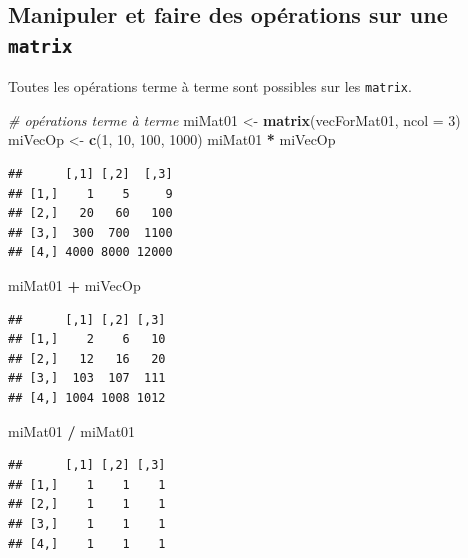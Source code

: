 \documentclass[]{book}
\newenvironment{Shaded}{\begin{snugshade}}{\end{snugshade}}
\newcommand{\CommentTok}[1]{\textcolor[rgb]{0.56,0.35,0.01}{\textit{#1}}}
\newcommand{\DataTypeTok}[1]{\textcolor[rgb]{0.13,0.29,0.53}{#1}}
\newcommand{\DecValTok}[1]{\textcolor[rgb]{0.00,0.00,0.81}{#1}}
\newcommand{\KeywordTok}[1]{\textcolor[rgb]{0.13,0.29,0.53}{\textbf{#1}}}
\newcommand{\NormalTok}[1]{#1}
\newcommand{\OperatorTok}[1]{\textcolor[rgb]{0.81,0.36,0.00}{\textbf{#1}}}
\newcommand{\StringTok}[1]{\textcolor[rgb]{0.31,0.60,0.02}{#1}}
\begin{document}
\hypertarget{manipuler-et-faire-des-operations-sur-une-matrix}{%
\subsection{\texorpdfstring{Manipuler et faire des opérations sur une \texttt{matrix}}{Manipuler et faire des opérations sur une matrix}}\label{manipuler-et-faire-des-operations-sur-une-matrix}}

Toutes les opérations terme à terme sont possibles sur les \texttt{matrix}.

\begin{Shaded}
\begin{Highlighting}[]
\CommentTok{# opérations terme à terme}
\NormalTok{miMat01 <-}\StringTok{ }\KeywordTok{matrix}\NormalTok{(vecForMat01, }\DataTypeTok{ncol =} \DecValTok{3}\NormalTok{)}
\NormalTok{miVecOp <-}\StringTok{ }\KeywordTok{c}\NormalTok{(}\DecValTok{1}\NormalTok{, }\DecValTok{10}\NormalTok{, }\DecValTok{100}\NormalTok{, }\DecValTok{1000}\NormalTok{)}
\NormalTok{miMat01 }\OperatorTok{*}\StringTok{ }\NormalTok{miVecOp}
\end{Highlighting}
\end{Shaded}

\begin{verbatim}
##      [,1] [,2]  [,3]
## [1,]    1    5     9
## [2,]   20   60   100
## [3,]  300  700  1100
## [4,] 4000 8000 12000
\end{verbatim}

\begin{Shaded}
\begin{Highlighting}[]
\NormalTok{miMat01 }\OperatorTok{+}\StringTok{ }\NormalTok{miVecOp}
\end{Highlighting}
\end{Shaded}

\begin{verbatim}
##      [,1] [,2] [,3]
## [1,]    2    6   10
## [2,]   12   16   20
## [3,]  103  107  111
## [4,] 1004 1008 1012
\end{verbatim}

\begin{Shaded}
\begin{Highlighting}[]
\NormalTok{miMat01 }\OperatorTok{/}\StringTok{ }\NormalTok{miMat01}
\end{Highlighting}
\end{Shaded}

\begin{verbatim}
##      [,1] [,2] [,3]
## [1,]    1    1    1
## [2,]    1    1    1
## [3,]    1    1    1
## [4,]    1    1    1
\end{verbatim}
\end{document}
